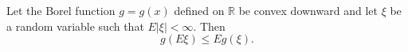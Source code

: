 Let the Borel function $g = g(x)$ defined on $\mathbb{R}$ be convex downward and let $\xi$ be a random variable such that $E|\xi| < \infty$. Then
$$g(E\xi) \leq E g(\xi).$$
